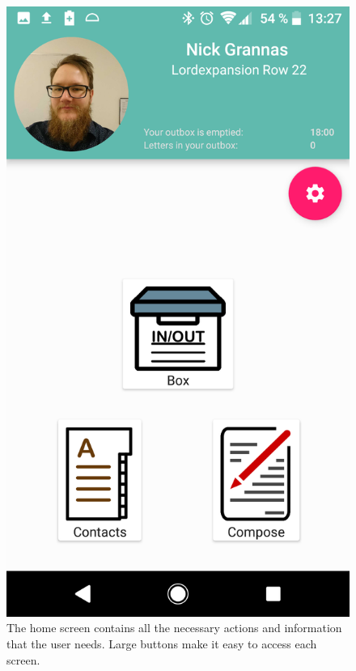 \documentclass[acmlarge, review=false, screen=true]{acmart}
\begin{document}
      \begin{figure}[!tbp]
        \centering
        \begin{minipage}[b]{0.4\textwidth}
          \includegraphics[width=\textwidth]{images/HOME.png}
          \caption{The home screen contains all the necessary actions and information that the user needs. Large buttons make it easy to access each screen.\newline}
          \label{fig:home}
        \end{minipage}

\end{figure}
\end{document}
